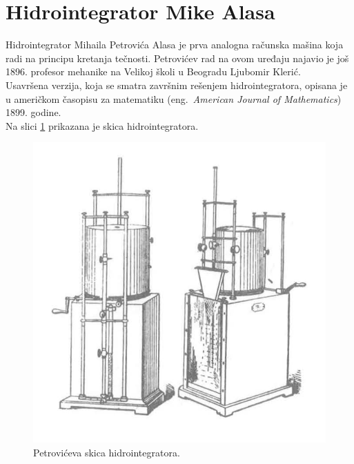 \documentclass[a4paper]{article}
\begin{document}
{\section{Hidrointegrator Mike Alasa}	
\label{sec:hidrointegrator}

Hidrointegrator Mihaila Petrovića Alasa je prva analogna računska mašina koja radi na principu kretanja tečnosti. Petrovićev rad na ovom uređaju najavio je još 1896. profesor mehanike na Velikoj školi u Beogradu Ljubomir Klerić.\\
Usavršena verzija, koja se smatra završnim rešenjem hidrointegratora, opisana je u američkom časopisu za matematiku (eng.~{\em American Journal of Mathematics}) 1899. godine.\cite{hidrointegrator}\\
Na slici \ref{fig:h1} prikazana je skica hidrointegratora. 

\bigskip

\begin{figure}[h!]
\begin{center}
\includegraphics[scale=1.5]{h1.jpg}
\end{center}
\caption{Petrovićeva skica hidrointegratora. }
\label{fig:h1}
\end{figure}

\bigskip







}
\end{document}
